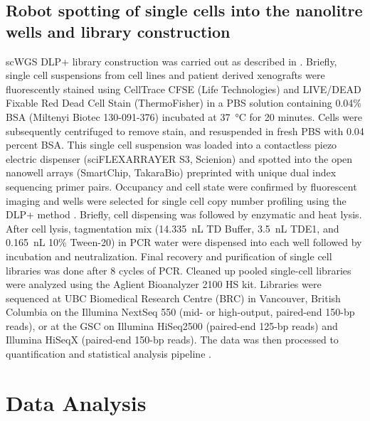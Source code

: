 \subsection{Robot spotting of single cells into the nanolitre wells and library construction}
scWGS DLP+ library construction was carried out as described in \cite{laks2019clonal}. Briefly, single cell suspensions from cell lines and patient derived xenografts were fluorescently stained using CellTrace CFSE (Life Technologies) and LIVE/DEAD Fixable Red Dead Cell Stain (ThermoFisher) in a PBS solution containing 0.04\% BSA (Miltenyi Biotec 130-091-376) incubated at \SI{37}{\degreeCelsius} for 20 minutes. Cells were subsequently centrifuged to remove stain, and resuspended in fresh PBS with 0.04 percent BSA. This single cell suspension was loaded into a contactless piezo electric dispenser (sciFLEXARRAYER S3, Scienion) and spotted into the open nanowell arrays (SmartChip, TakaraBio) preprinted with unique dual index sequencing primer pairs. Occupancy and cell state were confirmed by fluorescent imaging and wells were selected for single cell copy number profiling using the DLP+ method \cite{laks2019clonal}. Briefly, cell dispensing was followed by enzymatic and heat lysis. After cell lysis, tagmentation mix 
(\SI{14.335}{\nano\liter} TD Buffer, \SI{3.5}{\nano\liter} TDE1, and \SI{0.165}{\nano\liter} 10\% Tween-20) in PCR water were dispensed into each well followed by incubation and neutralization. Final recovery and purification of single cell libraries was done after 8 cycles of PCR. Cleaned up pooled single-cell libraries were analyzed using the Aglient Bioanalyzer 2100 HS kit. Libraries were sequenced at UBC Biomedical Research Centre (BRC) in Vancouver, British Columbia on the Illumina NextSeq 550 (mid- or high-output, paired-end 150-bp reads), or at the GSC on Illumina HiSeq2500 (paired-end 125-bp reads) and Illumina HiSeqX (paired-end 150-bp reads). The data was then processed to quantification and statistical analysis pipeline \cite{laks2019clonal}.




\section{Data Analysis}
